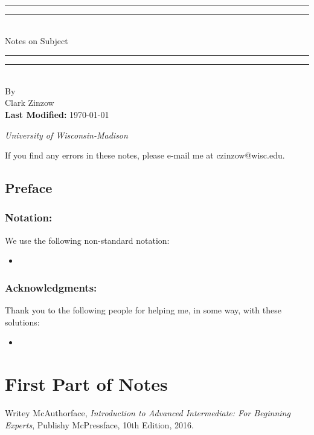 \documentclass[twoside, titlepage]{amsbook}
\makeatletter
\newcommand{\authorName}{Clark Zinzow}  %
\newcommand{\authorEmail}{czinzow@wisc.edu}  %
\newcommand{\subjectName}{Subject}  %
\newcommand{\institutionName}{University of Wisconsin-Madison}  %
\newcommand{\lastmodified}{\today}  %
\theoremstyle{plain} %
\theoremstyle{definition}
\theoremstyle{remark}
\theoremstyle{notation}
\makeatother
\begin{document}
	
\begin{titlepage}
	\centering
	\vspace*{\baselineskip}
	\rule{\textwidth}{1.6pt}\vspace*{-\baselineskip}\vspace*{2pt}
	\rule{\textwidth}{0.4pt}\\[\baselineskip]
	{\Huge Notes on  \subjectName }
	\rule{\textwidth}{0.4pt}\vspace*{-\baselineskip}\vspace*{3pt}
	\rule{\textwidth}{1.6pt}\\[\baselineskip]
	\vspace*{4\baselineskip}
	\huge By \\[\baselineskip]
	{ \authorName}\\[\baselineskip]
	\vspace*{3\baselineskip}
	\huge \textbf{Last Modified:} { \lastmodified } \par
	\vspace*{3\baselineskip}
	\huge {\itshape \institutionName \par}
	\vfill
	{ If you find any errors in these notes, please e-mail me at \authorEmail. \par}
\end{titlepage}

\tableofcontents

\blindmathtrue

\chapter*{Preface}

	\section*{Notation:}
		We use the following non-standard notation:
		\begin{itemize}
			\item 
		\end{itemize}
	
	\section*{Acknowledgments:}
		Thank you to the following people for helping me, in some way, with these solutions:
		\begin{itemize}
			\item 
		\end{itemize}

\part{First Part of Notes}

\blinddocument

\begin{thebibliography}{"McAuthorface16"}
	Writey McAuthorface,
	\emph{Introduction to Advanced Intermediate: For Beginning Experts},
	Publishy McPressface,
	10th Edition,
	2016.
\end{thebibliography}
\end{document}
